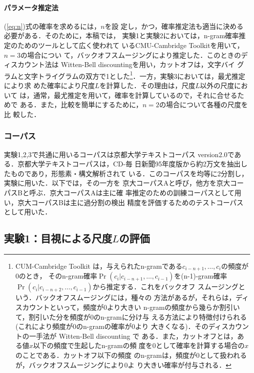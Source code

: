 \paragraph{パラメータ推定法} (\ref{eq:n})式の確率を求めるには，$n$を設
定し，かつ，確率推定法も適当に決める必要がある．そのために，本稿では，
実験1と実験2においては，n-gram確率推定のためのツールとして広く使われて
いるCMU-Cambridge Toolkit\cite{clarkson97}を用いて，$n=3$の場合につい
て，バックオフスムージングにより推定した．このときのディスカウント法は
Witten-Bell discounting\cite{placeway93}を用い，カットオフは，文字バイ
グラムと文字トライグラムの双方で1とした\footnote{CUM-Cambridge Toolkit
  は，与えられたn-gramである$c_{i-n+1},\ldots,c_{i}$の頻度が0のとき，
  そのn-gram確率$\Pr(c_i | c_{i-n+1},\ldots,c_{i-1})$を(n-1)-gram確率
  $\Pr(c_i | c_{i-n+2},\ldots,c_{i-1})$から推定する．これをバックオフ
  スムージングという\cite{Kita96}．バックオフスムージングには，種々の
  方法があるが，それらは，ディスカウントといって，頻度が0より大きい
  n-gramの頻度から幾らか割引いて，割引いた分を頻度が0のn-gramに分け与
  える方法により特徴付けられる(これにより頻度が0のn-gramの確率が0より
  大きくなる)．そのディスカウントの一手法が Witten-Bell discounting で
  ある．また，カットオフとは，ある値$x$以下の頻度で生起したn-gramの頻
  度を0として確率を計算する場合の$x$のことである．カットオフ以下の頻度
  のn-gramは，頻度が0として扱われるが，バックオフスムージングにより0よ
  り大きい確率が付与される．}．一方，実験3においては，最尤推定により求
めた確率により尺度$L$を計算した．その理由は，尺度$L$以外の尺度において
は，通常，最尤推定を用いて，確率を計算しているので，それに合せるためで
ある．また，比較を簡単にするために，$n=2$の場合について各種の尺度を比
較した．

\subsubsection*{コーパス}

実験1,2,3で共通に用いるコーパスは京都大学テキストコーパス
version2.0\cite{kurohashi98}である．京都大学テキストコーパスは，CD-毎
日新聞95年度版から約2万文を抽出したものであり，形態素・構文解析されて
いる．このコーパスを均等に2分割し，実験に用いた．以下では，その一方を
京大コーパスAと呼び，他方を京大コーパスBと呼ぶ．京大コーパスAは主に確
率推定のための訓練コーパスとして用い，京大コーパスBは主に過分割の検出
精度を評価するためのテストコーパスとして用いた．

\subsection{実験1：目視による尺度$L$の評価}
\label{sec:look}

